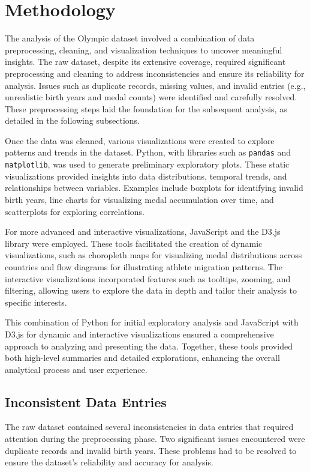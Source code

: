 \chapter{Methodology} \label{chap:method}

The analysis of the Olympic dataset involved a combination of data preprocessing, cleaning, and visualization techniques to uncover meaningful insights. The raw dataset, despite its extensive coverage, required significant preprocessing and cleaning to address inconsistencies and ensure its reliability for analysis. Issues such as duplicate records, missing values, and invalid entries (e.g., unrealistic birth years and medal counts) were identified and carefully resolved. These preprocessing steps laid the foundation for the subsequent analysis, as detailed in the following subsections.

Once the data was cleaned, various visualizations were created to explore patterns and trends in the dataset. Python, with libraries such as \texttt{pandas} and \texttt{matplotlib}, was used to generate preliminary exploratory plots. These static visualizations provided insights into data distributions, temporal trends, and relationships between variables. Examples include boxplots for identifying invalid birth years, line charts for visualizing medal accumulation over time, and scatterplots for exploring correlations.

For more advanced and interactive visualizations, JavaScript and the D3.js library were employed. These tools facilitated the creation of dynamic visualizations, such as choropleth maps for visualizing medal distributions across countries and flow diagrams for illustrating athlete migration patterns. The interactive visualizations incorporated features such as tooltips, zooming, and filtering, allowing users to explore the data in depth and tailor their analysis to specific interests.

This combination of Python for initial exploratory analysis and JavaScript with D3.js for dynamic and interactive visualizations ensured a comprehensive approach to analyzing and presenting the data. Together, these tools provided both high-level summaries and detailed explorations, enhancing the overall analytical process and user experience.

\section{Inconsistent Data Entries}

The raw dataset contained several inconsistencies in data entries that required attention during the preprocessing phase. Two significant issues encountered were duplicate records and invalid birth years. These problems had to be resolved to ensure the dataset's reliability and accuracy for analysis.

